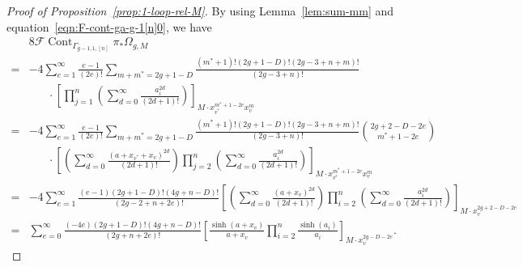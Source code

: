 \documentclass[12pt,reqno]{amsart}
\DeclareMathOperator{\Cont}{Cont}
\theoremstyle{plain}
\theoremstyle{definition}
\theoremstyle{remark}
\begin{document}
\begin{proof}[Proof of Proposition~\ref{prop:1-loop-rel-M}]
By using  Lemma~\ref{lem:sum-mm} and equation~\eqref{eqn:F-cont-ga-g-1[n]0}, we have
\begin{align*}
&8\mathcal{F}\Cont_{\Gamma_{g-1,1,[n]}}\pi_*\Omega_{g,M}
\\=&-4\sum_{e = 1}^\infty \frac{e - 1}{(2e)!} \sum_{m + m^* = 2g + 1 - D} \frac{(m^* + 1)!(2g + 1 - D)!(2g - 3 + n + m)!}{(2g - 3 + n)!} \\
  &\hspace{20pt}\cdot\left[\prod_{j = 1}^n \left(\sum_{d = 0}^\infty \frac{a_i^{2d}}{(2d + 1)!}\right) \right]_{M \cdot x_{v^*}^{m^* + 1 - 2e} x_v^{m}} \\
  =&-4\sum_{e = 1}^\infty \frac{e - 1}{(2e)!} \sum_{m + m^* = 2g + 1 - D} \frac{(m^* + 1)!(2g + 1 - D)!(2g - 3 + n + m)!}{ (2g - 3 + n)!} \binom{2g + 2 - D - 2e}{m^* + 1 - 2e} \\
  &\hspace{20pt}\cdot\left[\left(\sum_{d = 0}^\infty \frac{(a +x_{v^*}+ x_v)^{2d}}{(2d + 1)!}\right) \prod_{j = 2}^n \left(\sum_{d = 0}^\infty \frac{a_i^{2d}}{(2d + 1)!}\right) \right]_{M \cdot x_{v^*}^{m^* + 1 - 2e} x_v^{m}} \\
  = &-4\sum_{e = 1}^\infty \frac{(e - 1)(2g + 1 - D)! (4g + n - D)!}{(2g - 2 + n + 2e)!} \left[\left(\sum_{d = 0}^\infty \frac{(a + x_v)^{2d}}{(2d + 1)!}\right) \prod_{i = 2}^n \left(\sum_{d = 0}^\infty \frac{a_i^{2d}}{(2d + 1)!}\right) \right]_{M \cdot x_v^{2g + 2 - D - 2e}} \\
  = &\sum_{e = 0}^\infty \frac{(-4e)(2g + 1 - D)! (4g + n - D)!}{(2g + n + 2e)!}
  \left[\frac{\sinh(a + x_v)}{a + x_v } \prod_{i = 2}^n \frac{\sinh(a_i)}{a_i} \right]_{M \cdot x_v^{2g - D - 2e}}.
\end{align*}
   


\end{proof}
\end{document}

